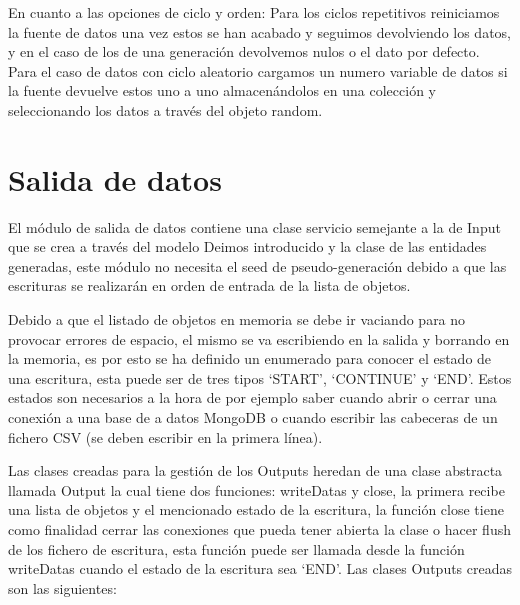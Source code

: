 En cuanto a las opciones de ciclo y orden: Para los ciclos repetitivos reiniciamos la fuente de datos una vez estos se han acabado y seguimos devolviendo los datos, y en el caso de los de una generación devolvemos nulos o el dato por defecto. Para el caso de datos con ciclo aleatorio cargamos un numero variable de datos si la fuente devuelve estos uno a uno almacenándolos en una colección y seleccionando los datos a través del objeto random.

\section{Salida de datos}

El módulo de salida de datos contiene una clase servicio semejante a la de Input que se crea a través del modelo Deimos introducido y la clase de las entidades generadas, este módulo no necesita el seed de pseudo-generación debido a que las escrituras se realizarán en orden de entrada de la lista de objetos.

Debido a que el listado de objetos en memoria se debe ir vaciando para no provocar errores de espacio, el mismo se va escribiendo en la salida y borrando en la memoria, es por esto se ha definido un enumerado para conocer el estado de una escritura, esta puede ser de tres tipos `START', `CONTINUE' y `END'. Estos estados son necesarios a la hora de por ejemplo saber cuando abrir o cerrar una conexión a una base de a datos MongoDB o cuando escribir las cabeceras de un fichero CSV (se deben escribir en la primera línea).

Las clases creadas para la gestión de los Outputs heredan de una clase abstracta llamada Output la cual tiene dos funciones: writeDatas y close, la primera recibe una lista de objetos y el mencionado estado de la escritura, la función close tiene como finalidad cerrar las conexiones que pueda tener abierta la clase o hacer flush de los fichero de escritura, esta función puede ser llamada desde la función writeDatas cuando el estado de la escritura sea `END'. Las clases Outputs creadas son las siguientes:

